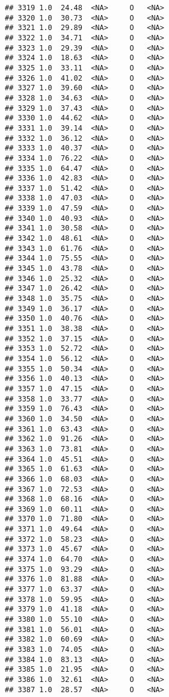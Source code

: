 \documentclass[
]{article}
\begin{document}
\begin{verbatim}
## 3319 1.0  24.48  <NA>     O   <NA>
## 3320 1.0  30.73  <NA>     O   <NA>
## 3321 1.0  29.89  <NA>     O   <NA>
## 3322 1.0  34.71  <NA>     O   <NA>
## 3323 1.0  29.39  <NA>     O   <NA>
## 3324 1.0  18.63  <NA>     O   <NA>
## 3325 1.0  33.11  <NA>     O   <NA>
## 3326 1.0  41.02  <NA>     O   <NA>
## 3327 1.0  39.60  <NA>     O   <NA>
## 3328 1.0  34.63  <NA>     O   <NA>
## 3329 1.0  37.43  <NA>     O   <NA>
## 3330 1.0  44.62  <NA>     O   <NA>
## 3331 1.0  39.14  <NA>     O   <NA>
## 3332 1.0  36.12  <NA>     O   <NA>
## 3333 1.0  40.37  <NA>     O   <NA>
## 3334 1.0  76.22  <NA>     O   <NA>
## 3335 1.0  64.47  <NA>     O   <NA>
## 3336 1.0  42.83  <NA>     O   <NA>
## 3337 1.0  51.42  <NA>     O   <NA>
## 3338 1.0  47.03  <NA>     O   <NA>
## 3339 1.0  47.59  <NA>     O   <NA>
## 3340 1.0  40.93  <NA>     O   <NA>
## 3341 1.0  30.58  <NA>     O   <NA>
## 3342 1.0  48.61  <NA>     O   <NA>
## 3343 1.0  61.76  <NA>     O   <NA>
## 3344 1.0  75.55  <NA>     O   <NA>
## 3345 1.0  43.78  <NA>     O   <NA>
## 3346 1.0  25.32  <NA>     O   <NA>
## 3347 1.0  26.42  <NA>     O   <NA>
## 3348 1.0  35.75  <NA>     O   <NA>
## 3349 1.0  36.17  <NA>     O   <NA>
## 3350 1.0  40.76  <NA>     O   <NA>
## 3351 1.0  38.38  <NA>     O   <NA>
## 3352 1.0  37.15  <NA>     O   <NA>
## 3353 1.0  52.72  <NA>     O   <NA>
## 3354 1.0  56.12  <NA>     O   <NA>
## 3355 1.0  50.34  <NA>     O   <NA>
## 3356 1.0  40.13  <NA>     O   <NA>
## 3357 1.0  47.15  <NA>     O   <NA>
## 3358 1.0  33.77  <NA>     O   <NA>
## 3359 1.0  76.43  <NA>     O   <NA>
## 3360 1.0  34.50  <NA>     O   <NA>
## 3361 1.0  63.43  <NA>     O   <NA>
## 3362 1.0  91.26  <NA>     O   <NA>
## 3363 1.0  73.81  <NA>     O   <NA>
## 3364 1.0  45.51  <NA>     O   <NA>
## 3365 1.0  61.63  <NA>     O   <NA>
## 3366 1.0  68.03  <NA>     O   <NA>
## 3367 1.0  72.53  <NA>     O   <NA>
## 3368 1.0  68.16  <NA>     O   <NA>
## 3369 1.0  60.11  <NA>     O   <NA>
## 3370 1.0  71.80  <NA>     O   <NA>
## 3371 1.0  49.64  <NA>     O   <NA>
## 3372 1.0  58.23  <NA>     O   <NA>
## 3373 1.0  45.67  <NA>     O   <NA>
## 3374 1.0  64.70  <NA>     O   <NA>
## 3375 1.0  93.29  <NA>     O   <NA>
## 3376 1.0  81.88  <NA>     O   <NA>
## 3377 1.0  63.37  <NA>     O   <NA>
## 3378 1.0  59.95  <NA>     O   <NA>
## 3379 1.0  41.18  <NA>     O   <NA>
## 3380 1.0  55.10  <NA>     O   <NA>
## 3381 1.0  56.01  <NA>     O   <NA>
## 3382 1.0  60.69  <NA>     O   <NA>
## 3383 1.0  74.05  <NA>     O   <NA>
## 3384 1.0  83.13  <NA>     O   <NA>
## 3385 1.0  21.95  <NA>     O   <NA>
## 3386 1.0  32.61  <NA>     O   <NA>
## 3387 1.0  28.57  <NA>     O   <NA>

\end{verbatim}
\end{document}
